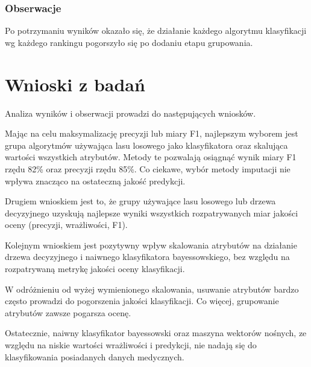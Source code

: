 \documentclass[../thesis.tex]{subfiles}
\begin{document}
\subsubsection{Obserwacje}

Po potrzymaniu wyników okazało się, że działanie każdego algorytmu klasyfikacji wg każdego rankingu pogorszyło się po dodaniu etapu grupowania.

\section{Wnioski z badań}

Analiza wyników i obserwacji prowadzi do następujących wniosków.

Mając na celu maksymalizację precyzji lub miary F1, najlepszym wyborem jest grupa algorytmów używająca lasu losowego jako klasyfikatora oraz skalująca wartości wszystkich atrybutów. Metody te pozwalają osiągnąć wynik miary F1 rzędu 82\% oraz precyzji rzędu 85\%. Co ciekawe, wybór metody imputacji nie wpływa znacząco na ostateczną jakość predykcji.

Drugiem wnioskiem jest to, że grupy używające lasu losowego lub drzewa decyzyjnego uzyskują najlepsze wyniki wszystkich rozpatrywanych miar jakości oceny (precyzji, wrażliwości, F1).

Kolejnym wnioskiem jest pozytywny wpływ skalowania atrybutów na działanie drzewa decyzyjnego i naiwnego klasyfikatora bayessowskiego, bez względu na rozpatrywaną metrykę jakości oceny klasyfikacji.

W odróżnieniu od wyżej wymienionego skalowania, usuwanie atrybutów bardzo często prowadzi do pogorszenia jakości klasyfikacji. Co więcej, grupowanie atrybutów zawsze pogarsza ocenę.

Ostatecznie, naiwny klasyfikator bayessowski oraz maszyna wektorów nośnych, ze względu na niskie wartości wrażliwości i predykcji, nie nadają się do klasyfikowania posiadanych danych medycznych.
\end{document}
